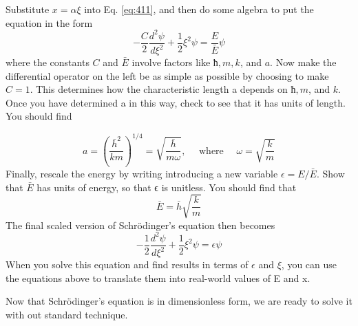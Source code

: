 	\begin{problem} \label{P4.3}  Substitute $x = \alpha \xi$ into Eq. \ref{eq:411}, and then do some algebra to put the
equation in the form
\begin{equation}\label{eq:412}
-\frac{C}{2} \frac{d^{2} \psi}{d \xi^{2}}+\frac{1}{2} \xi^{2} \psi=\frac{E}{\bar{E}} \psi
\end{equation}
where the constants $C$ and $\bar{E}$ involve factors like $ħ, m, k$, and $a$.
Now make the differential operator on the left be as simple as possible by
choosing to make $C = 1$. This determines how the characteristic length a
depends on $ħ, m$, and $k$. Once you have determined a in this way, check to
see that it has units of length. You should find

\begin{equation}\label{eq:413}
a=\left(\frac{\bar{h}^{2}}{k m}\right)^{1 / 4}=\sqrt{\frac{\bar{h}}{m \omega}}, \quad \text { where } \quad \omega=\sqrt{\frac{k}{m}}
\end{equation}
Finally, rescale the energy by writing introducing a new variable $	\epsilon = E/\bar{E}$.
Show that $\bar{E}$ has units of energy, so that ϵ is unitless. You should find that
 \begin{equation}\label{eq:414}
\bar{E} = \bar{h}\sqrt{\frac{k}{m}}
\end{equation}
The final scaled version of Schrödinger\rq s equation then becomes
\begin{equation}\label{eq:415}
-\frac{1}{2} \frac{d^{2} \psi}{d \xi^{2}}+\frac{1}{2} \xi^{2} \psi=\epsilon \psi
\end{equation}
When you solve this equation and find results in terms of $\epsilon$ and $\xi$, you can
use the equations above to translate them into real-world values of E and x.\\ \end{problem}
Now that Schrödinger\rq s equation is in dimensionless form, we are ready to
solve it with out standard technique.



